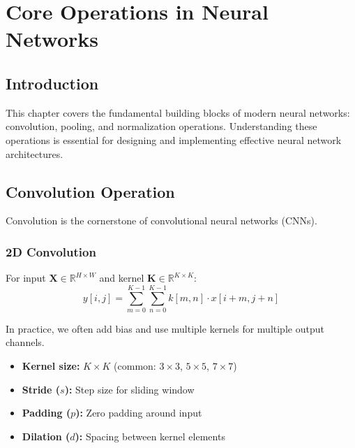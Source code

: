 %

\clearpage
\cleardoublepage

\chapter{Core Operations in Neural Networks}

\section{Introduction}

This chapter covers the fundamental building blocks of modern neural networks: convolution, pooling, and normalization operations. Understanding these operations is essential for designing and implementing effective neural network architectures.

\section{Convolution Operation}

Convolution is the cornerstone of convolutional neural networks (CNNs).

\subsection{2D Convolution}

For input $\mathbf{X} \in \mathbb{R}^{H \times W}$ and kernel $\mathbf{K} \in \mathbb{R}^{K \times K}$:
\begin{equation}
y[i,j] = \sum_{m=0}^{K-1}\sum_{n=0}^{K-1} k[m,n] \cdot x[i+m, j+n]
\end{equation}

In practice, we often add bias and use multiple kernels for multiple output channels.

\begin{properties}
\begin{itemize}
    \item \textbf{Kernel size:} $K \times K$ (common: $3\times3$, $5\times5$, $7\times7$)
    \item \textbf{Stride ($s$):} Step size for sliding window
    \item \textbf{Padding ($p$):} Zero padding around input
    \item \textbf{Dilation ($d$):} Spacing between kernel elements
\end{itemize}
\end{properties}

